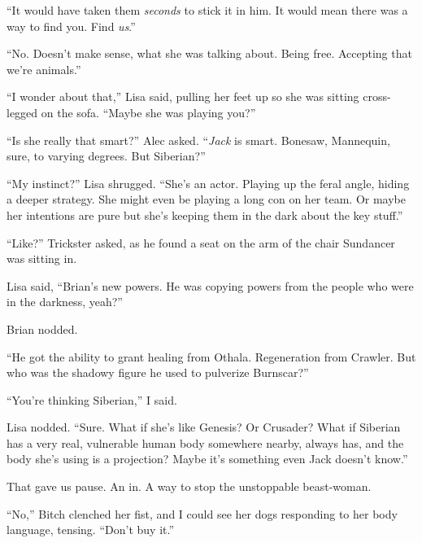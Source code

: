 ``It would have taken them \emph{seconds} to stick it in him.  It would mean there was a way to find you.  Find \emph{us}.''



``No.  Doesn't make sense, what she was talking about.  Being free.  Accepting that we're animals.''



``I wonder about that,'' Lisa said, pulling her feet up so she was sitting cross-legged on the sofa.  ``Maybe she was playing you?''



``Is she really that smart?'' Alec asked.  ``\emph{Jack} is smart.  Bonesaw, Mannequin, sure, to varying degrees.  But Siberian?''



``My instinct?'' Lisa shrugged.  ``She's an actor.  Playing up the feral angle, hiding a deeper strategy.  She might even be playing a long con on her team.  Or maybe her intentions are pure but she's keeping them in the dark about the key stuff.''



``Like?'' Trickster asked, as he found a seat on the arm of the chair Sundancer was sitting in.



Lisa said, ``Brian's new powers.  He was copying powers from the people who were in the darkness, yeah?''



Brian nodded.



``He got the ability to grant healing from Othala.  Regeneration from Crawler.  But who was the shadowy figure he used to pulverize Burnscar?''



``You're thinking Siberian,'' I said.



Lisa nodded.  ``Sure.  What if she's like Genesis?  Or Crusader?  What if Siberian has a very real, vulnerable human body somewhere nearby, always has, and the body she's using is a projection?  Maybe it's something even Jack doesn't know.''



That gave us pause.  An in.  A way to stop the unstoppable beast-woman.



``No,'' Bitch clenched her fist, and I could see her dogs responding to her body language, tensing.  ``Don't buy it.''




